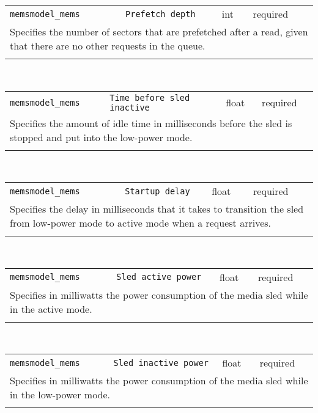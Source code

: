 \noindent 
\begin{tabular}{|p{\lpmodwidth}|p{\lpnamewidth}|p{0.5in}|p{0.5in}|}
\cline{1-4}
\texttt{memsmodel\_mems} & \texttt{Prefetch depth} & int & required \\ 
\cline{1-4}
\multicolumn{4}{|p{6in}|}{
Specifies the number of sectors that are prefetched after a read,
given that there are no other requests in the queue.
}\\ 
\cline{1-4}
\multicolumn{4}{p{5in}}{}\\
\end{tabular}\\ 
\noindent 
\begin{tabular}{|p{\lpmodwidth}|p{\lpnamewidth}|p{0.5in}|p{0.5in}|}
\cline{1-4}
\texttt{memsmodel\_mems} & \texttt{Time before sled inactive} & float & required \\ 
\cline{1-4}
\multicolumn{4}{|p{6in}|}{
Specifies the amount of idle time in milliseconds before the sled is
stopped and put into the low-power mode.
}\\ 
\cline{1-4}
\multicolumn{4}{p{5in}}{}\\
\end{tabular}\\ 
\noindent 
\begin{tabular}{|p{\lpmodwidth}|p{\lpnamewidth}|p{0.5in}|p{0.5in}|}
\cline{1-4}
\texttt{memsmodel\_mems} & \texttt{Startup delay} & float & required \\ 
\cline{1-4}
\multicolumn{4}{|p{6in}|}{
Specifies the delay in milliseconds that it takes to transition the
sled from low-power mode to active mode when a request arrives.
}\\ 
\cline{1-4}
\multicolumn{4}{p{5in}}{}\\
\end{tabular}\\ 
\noindent 
\begin{tabular}{|p{\lpmodwidth}|p{\lpnamewidth}|p{0.5in}|p{0.5in}|}
\cline{1-4}
\texttt{memsmodel\_mems} & \texttt{Sled active power} & float & required \\ 
\cline{1-4}
\multicolumn{4}{|p{6in}|}{
Specifies in milliwatts the power consumption of the media sled while
in the active mode.
}\\ 
\cline{1-4}
\multicolumn{4}{p{5in}}{}\\
\end{tabular}\\ 
\noindent 
\begin{tabular}{|p{\lpmodwidth}|p{\lpnamewidth}|p{0.5in}|p{0.5in}|}
\cline{1-4}
\texttt{memsmodel\_mems} & \texttt{Sled inactive power} & float & required \\ 
\cline{1-4}
\multicolumn{4}{|p{6in}|}{
Specifies in milliwatts the power consumption of the media sled while
in the low-power mode.
}\\ 
\cline{1-4}
\multicolumn{4}{p{5in}}{}\\
\end{tabular}\\ 
